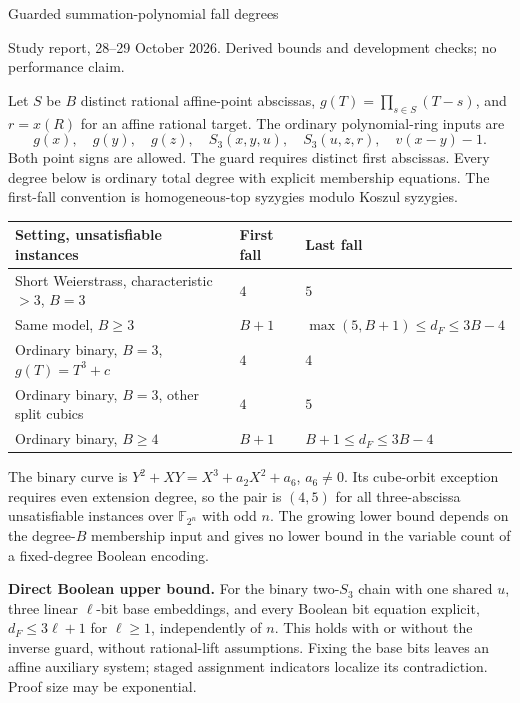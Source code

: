 \documentclass[11pt]{article}
\begin{document}
\begin{center}
{\Large Guarded summation-polynomial fall degrees}\par
{\small Study report, 28--29 October 2026. Derived bounds and development checks; no performance claim.}
\end{center}

Let $S$ be $B$ distinct rational affine-point abscissas, $g(T)=\prod_{s\in S}(T-s)$,
and $r=x(R)$ for an affine rational target. The ordinary polynomial-ring inputs are
\[
g(x),\quad g(y),\quad g(z),\quad S_3(x,y,u),\quad S_3(u,z,r),\quad v(x-y)-1.
\]
Both point signs are allowed. The guard requires distinct first abscissas.
Every degree below is ordinary total degree with explicit membership equations.
The first-fall convention is homogeneous-top syzygies modulo Koszul syzygies.

\begin{center}
\begin{tabular}{lll}
\toprule
Setting, unsatisfiable instances & First fall & Last fall \\
\midrule
Short Weierstrass, characteristic $>3$, $B=3$ & $4$ & $5$ \\
Same model, $B\ge3$ & $B+1$ & $\max(5,B+1)\le d_F\le3B-4$ \\
Ordinary binary, $B=3$, $g(T)=T^3+c$ & $4$ & $4$ \\
Ordinary binary, $B=3$, other split cubics & $4$ & $5$ \\
Ordinary binary, $B\ge4$ & $B+1$ & $B+1\le d_F\le3B-4$ \\
\bottomrule
\end{tabular}
\end{center}

The binary curve is $Y^2+XY=X^3+a_2X^2+a_6$, $a_6\ne0$.
Its cube-orbit exception requires even extension degree, so the pair is $(4,5)$
for all three-abscissa unsatisfiable instances over $\mathbb F_{2^n}$ with odd $n$.
The growing lower bound depends on the degree-$B$ membership input and gives
no lower bound in the variable count of a fixed-degree Boolean encoding.

\textbf{Direct Boolean upper bound.} For the binary two-$S_3$ chain with one
shared $u$, three linear $\ell$-bit base embeddings, and every Boolean bit
equation explicit, $d_F\le3\ell+1$ for $\ell\ge1$, independently of $n$.
This holds with or without the inverse guard, without rational-lift assumptions.
Fixing the base bits leaves an affine auxiliary system; staged assignment
indicators localize its contradiction. Proof size may be exponential.
\end{document}
